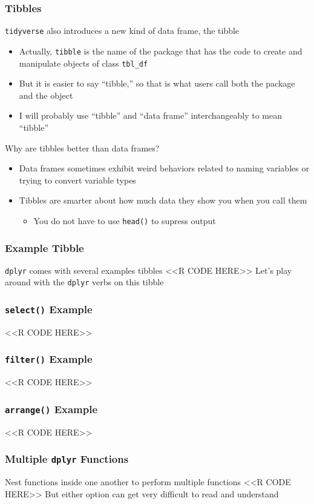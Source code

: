 \documentclass{beamer}
\begin{document}
\begin{frame}\frametitle{Tibbles}
    \texttt{tidyverse} also introduces a new kind of data frame, the tibble
    \begin{itemize}
        \item Actually, \texttt{tibble} is the name of the package that has the code to create and manipulate objects of class \texttt{tbl\_df}
        \item But it is easier to say ``tibble,'' so that is what users call both the package and the object
        \item I will probably use ``tibble'' and  ``data frame'' interchangeably to mean ``tibble''
    \end{itemize}
    \vspace{2ex}
    Why are tibbles better than data frames?
    \begin{itemize}
        \item Data frames sometimes exhibit weird behaviors related to naming variables or trying to convert variable types
        \item Tibbles are smarter about how much data they show you when you call them
        \begin{itemize}
            \item You do not have to use \texttt{head()} to supress output
        \end{itemize}
    \end{itemize}
\end{frame}

\begin{frame}[fragile]\frametitle{Example Tibble}
    \texttt{dplyr} comes with several examples tibbles
    <<R CODE HERE>>
    Let's play around with the \texttt{dplyr} verbs on this tibble
\end{frame}

\begin{frame}[fragile]\frametitle{\texttt{select()} Example}
    <<R CODE HERE>>
\end{frame}

\begin{frame}[fragile]\frametitle{\texttt{filter()} Example}
    <<R CODE HERE>>
\end{frame}

\begin{frame}[fragile]\frametitle{\texttt{arrange()} Example}
    <<R CODE HERE>>
\end{frame}

\begin{frame}[fragile]\frametitle{Multiple \texttt{dplyr} Functions}
    Nest functions inside one another to perform multiple functions
    <<R CODE HERE>>
    \vspace{1ex}
    But either option can get very difficult to read and understand
\end{frame}
\end{document}

